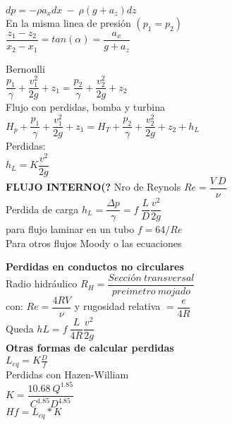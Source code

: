 \documentclass[11pt,a4paper]{article}
\begin{document}
\begin{multicols}{2}
		\begin{cajita}
			\vspace{.1cm}
			
			
			$dp=-\rho a_x dx~-~\rho(g +a_z)dz$\\
			En la misma linea de presión $(p_1 = p_2)$\\
			$\dfrac{z_1-z_2}{x_2-x_1}=tan(\alpha)=\dfrac{a_x}{g+a_z}$
			
			
			
		\end{cajita}
		
		\begin{cajita}
			\vspace{.1cm}
			
			Bernoulli\\
			$\dfrac{p_1}{\gamma}+\dfrac{v_1^2}{2g}+z_1=\dfrac{p_2}{\gamma}+\dfrac{v_2^2}{2g}+z_2$\\
			Flujo con perdidas, bomba y turbina\\
			$H_p+\dfrac{p_1}{\gamma}+\dfrac{v_1^2}{2g}+z_1=H_T+\dfrac{p_2}{\gamma}+\dfrac{v_2^2}{2g}+z_2+h_L$\\
			Perdidas:\\
			$h_L= K\dfrac{v^2}{2g}$\\
			
			
			\textbf{FLUJO INTERNO(?}
			Nro de Reynols $Re=\dfrac{V~D}{\nu}$\\
			Perdida de carga $h_L=\dfrac{\Delta p}{\gamma}=f~\dfrac{L}{D}\dfrac{v^2}{2g}$\\
			para flujo laminar en un tubo $f=64/Re$\\
			Para otros flujos Moody o las ecuaciones
			\vspace*{0.5cm}
			
\textbf{Perdidas en conductos no circulares}\\
			Radio hidráulico $R_H=\dfrac{Sección~transversal }{preimetro~mojado}$\\
			con: $Re=\dfrac{4RV}{\nu}$ y rugosidad relativa $=\dfrac{e}{4R}$\\
			Queda $hL=f~\dfrac{L}{4R}\dfrac{v^2}{2g}$\\
	\textbf{Otras formas de calcular perdidas}\\
	$L_{eq}=K\frac{D}{f}$\\
	Perdidas con Hazen-William \\
	$K=\dfrac{10.68~Q^{1.85}}{C^{1.85}D^{4.85}}$\\
	$Hf=L_{eq}*K$\\
	

\end{cajita}
\end{multicols}
\end{document}
